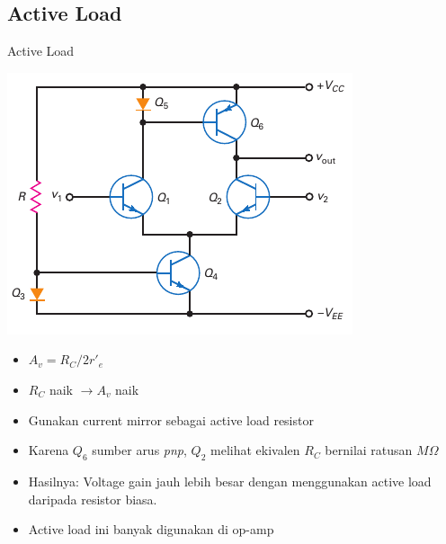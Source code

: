 \documentclass[aspectratio=169]{beamer}
\begin{document}
\subsection{Active Load}
\begin{frame}{Active Load}
	\begin{multicols}{2}
		\begin{center}
			\includegraphics[height=0.6\textheight]{gambar/01.fig30}
		\end{center}
		\columnbreak
		\begin{itemize}
			\item $ A_v = R_C / 2r'_e $
			\item $ R_C $ naik $ \rightarrow A_v$ naik
			\item Gunakan current mirror sebagai active load resistor
			\item Karena $ Q_6 $ sumber arus \textit{pnp}, $ Q_2 $ melihat ekivalen $ R_C $ bernilai ratusan $ M\Omega $
			\item Hasilnya: Voltage gain jauh lebih besar dengan menggunakan active load daripada resistor biasa.
			\item Active load ini banyak digunakan di op-amp
		\end{itemize}
	\end{multicols}
\end{frame}
\end{document}
